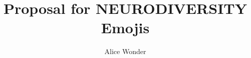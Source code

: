 \documentclass[letterpaper, 11pt]{scrartcl}
\title{Proposal for NEURODIVERSITY Emojis}
\author{Alice Wonder}
\begin{document}
\maketitle




\pagebreak
\tableofcontents
\pagebreak
\listoffigures

\pagebreak








\pagebreak
\appendix

\pagebreak

\end{document}
